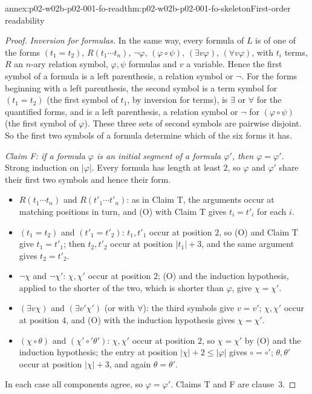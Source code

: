 \begin{annexitem}{annex:p02-w02b-p02-001-fo-read}{thm:p02-w02b-p02-001-fo-skeleton}{First-order readability}
\begin{proof}
\emph{Inversion for formulas.}  In the same way, every formula of \(L\) is
of one of the forms \((t_1=t_2)\), \(R(t_1\cdots t_n)\), \(\neg\varphi\),
\((\varphi\circ\psi)\), \((\exists v\varphi)\), \((\forall v\varphi)\), with
\(t_i\) terms, \(R\) an \(n\)-ary relation symbol, \(\varphi,\psi\)
formulas and \(v\) a variable.  Hence the first symbol of a formula is a
left parenthesis, a relation symbol or \(\neg\).  For the forms beginning
with a left parenthesis, the second symbol is a term symbol for
\((t_1=t_2)\) (the first symbol of \(t_1\), by inversion for terms), is
\(\exists\) or \(\forall\) for the quantified forms, and is a left
parenthesis, a relation symbol or \(\neg\) for \((\varphi\circ\psi)\) (the
first symbol of \(\varphi\)).  These three sets of second symbols are
pairwise disjoint.  So the first two symbols of a formula determine which
of the six forms it has.

\emph{Claim F: if a formula \(\varphi\) is an initial segment of a formula
\(\varphi'\), then \(\varphi=\varphi'\).}  Strong induction on
\(|\varphi|\).  Every formula has length at least \(2\), so \(\varphi\) and
\(\varphi'\) share their first two symbols and hence their form.
\begin{itemize}
\item \(R(t_1\cdots t_n)\) and \(R(t'_1\cdots t'_n)\): as in Claim T, the
  arguments occur at matching positions in turn, and (O) with Claim T gives
  \(t_i=t'_i\) for each \(i\).
\item \((t_1=t_2)\) and \((t'_1=t'_2)\): \(t_1,t'_1\) occur at position
  \(2\), so (O) and Claim T give \(t_1=t'_1\); then \(t_2,t'_2\) occur at
  position \(|t_1|+3\), and the same argument gives \(t_2=t'_2\).
\item \(\neg\chi\) and \(\neg\chi'\): \(\chi,\chi'\) occur at position \(2\);
  (O) and the induction hypothesis, applied to the shorter of the two,
  which is shorter than \(\varphi\), give \(\chi=\chi'\).
\item \((\exists v\chi)\) and \((\exists v'\chi')\) (or with \(\forall\)): the
  third symbols give \(v=v'\); \(\chi,\chi'\) occur at position \(4\), and
  (O) with the induction hypothesis gives \(\chi=\chi'\).
\item \((\chi\circ\theta)\) and \((\chi'\circ'\theta')\): \(\chi,\chi'\)
  occur at position \(2\), so \(\chi=\chi'\) by (O) and the induction
  hypothesis; the entry at position \(|\chi|+2\le|\varphi|\) gives
  \(\circ=\circ'\); \(\theta,\theta'\) occur at position \(|\chi|+3\), and
  again \(\theta=\theta'\).
\end{itemize}
In each case all components agree, so \(\varphi=\varphi'\).  Claims T and F
are clause~3.


\end{proof}
\end{annexitem}
